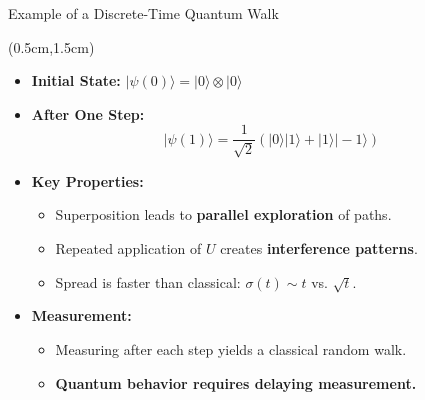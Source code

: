\documentclass{beamer}
\theoremstyle{definition}
\begin{document}
\begin{frame}{Example of a Discrete-Time Quantum Walk}
    
    \begin{textblock*}{12cm}(0.5cm,1.5cm)
        \begin{itemize}
            \item \textbf{Initial State:} $|\psi(0)\rangle = |0\rangle \otimes |0\rangle$
        
            \item \textbf{After One Step:}
            \[
            |\psi(1)\rangle = \frac{1}{\sqrt{2}} \left( |0\rangle|1\rangle + |1\rangle|-1\rangle \right)
            \]
        
            \item \textbf{Key Properties:}
            \begin{itemize}
                \item Superposition leads to \textbf{parallel exploration} of paths.
                \item Repeated application of $U$ creates \textbf{interference patterns}.
                \item Spread is faster than classical: $\sigma(t) \sim t$ vs. $\sqrt{t}$.
            \end{itemize}
        
            \vspace{0.5cm}
            \item \textbf{Measurement:}
            \begin{itemize}
                \item Measuring after each step yields a classical random walk.
                \item \textbf{Quantum behavior requires delaying measurement.}
            \end{itemize}
        \end{itemize}


                   
    \end{textblock*}
\end{frame}
\end{document}
